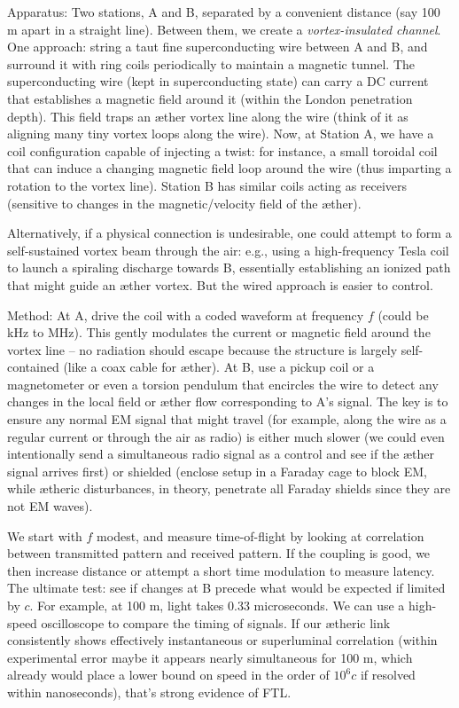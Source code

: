 Apparatus: Two stations, A and B, separated by a convenient distance (say 100 m apart in a straight line). Between them, we create a \textit{vortex-insulated channel}. One approach: string a taut fine superconducting wire between A and B, and surround it with ring coils periodically to maintain a magnetic tunnel. The superconducting wire (kept in superconducting state) can carry a DC current that establishes a magnetic field around it (within the London penetration depth). This field traps an æther vortex line along the wire (think of it as aligning many tiny vortex loops along the wire). Now, at Station A, we have a coil configuration capable of injecting a twist: for instance, a small toroidal coil that can induce a changing magnetic field loop around the wire (thus imparting a rotation to the vortex line). Station B has similar coils acting as receivers (sensitive to changes in the magnetic/velocity field of the æther).


Alternatively, if a physical connection is undesirable, one could attempt to form a self-sustained vortex beam through the air: e.g., using a high-frequency Tesla coil to launch a spiraling discharge towards B, essentially establishing an ionized path that might guide an æther vortex. But the wired approach is easier to control.


Method: At A, drive the coil with a coded waveform at frequency $f$ (could be kHz to MHz). This gently modulates the current or magnetic field around the vortex line – no radiation should escape because the structure is largely self-contained (like a coax cable for æther). At B, use a pickup coil or a magnetometer or even a torsion pendulum that encircles the wire to detect any changes in the local field or æther flow corresponding to A's signal. The key is to ensure any normal EM signal that might travel (for example, along the wire as a regular current or through the air as radio) is either much slower (we could even intentionally send a simultaneous radio signal as a control and see if the æther signal arrives first) or shielded (enclose setup in a Faraday cage to block EM, while ætheric disturbances, in theory, penetrate all Faraday shields since they are not EM waves).


We start with $f$ modest, and measure time-of-flight by looking at correlation between transmitted pattern and received pattern. If the coupling is good, we then increase distance or attempt a short time modulation to measure latency. The ultimate test: see if changes at B precede what would be expected if limited by $c$. For example, at 100 m, light takes 0.33 microseconds. We can use a high-speed oscilloscope to compare the timing of signals. If our ætheric link consistently shows effectively instantaneous or superluminal correlation (within experimental error maybe it appears nearly simultaneous for 100 m, which already would place a lower bound on speed in the order of $10^6 c$ if resolved within nanoseconds), that's strong evidence of FTL.


